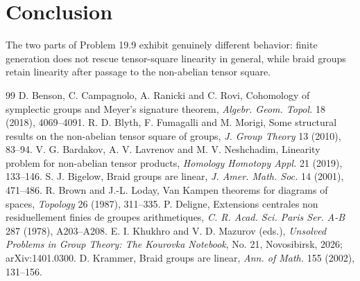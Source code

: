 \documentclass[11pt]{amsart}
\theoremstyle{definition}
\begin{document}
\section{Conclusion}
The two parts of Problem 19.9 exhibit genuinely different behavior: finite generation does not rescue tensor-square linearity in general, while braid groups retain linearity after passage to the non-abelian tensor square.

\begin{thebibliography}{99}
 D. Benson, C. Campagnolo, A. Ranicki and C. Rovi, Cohomology of symplectic groups and Meyer's signature theorem, \emph{Algebr. Geom. Topol.} 18 (2018), 4069--4091.
 R. D. Blyth, F. Fumagalli and M. Morigi, Some structural results on the non-abelian tensor square of groups, \emph{J. Group Theory} 13 (2010), 83--94.
 V. G. Bardakov, A. V. Lavrenov and M. V. Neshchadim, Linearity problem for non-abelian tensor products, \emph{Homology Homotopy Appl.} 21 (2019), 133--146.
 S. J. Bigelow, Braid groups are linear, \emph{J. Amer. Math. Soc.} 14 (2001), 471--486.
 R. Brown and J.-L. Loday, Van Kampen theorems for diagrams of spaces, \emph{Topology} 26 (1987), 311--335.
 P. Deligne, Extensions centrales non residuellement finies de groupes arithmetiques, \emph{C. R. Acad. Sci. Paris Ser. A-B} 287 (1978), A203--A208.
 E. I. Khukhro and V. D. Mazurov (eds.), \emph{Unsolved Problems in Group Theory: The Kourovka Notebook}, No. 21, Novosibirsk, 2026; arXiv:1401.0300.
 D. Krammer, Braid groups are linear, \emph{Ann. of Math.} 155 (2002), 131--156.
\end{thebibliography}
\end{document}
